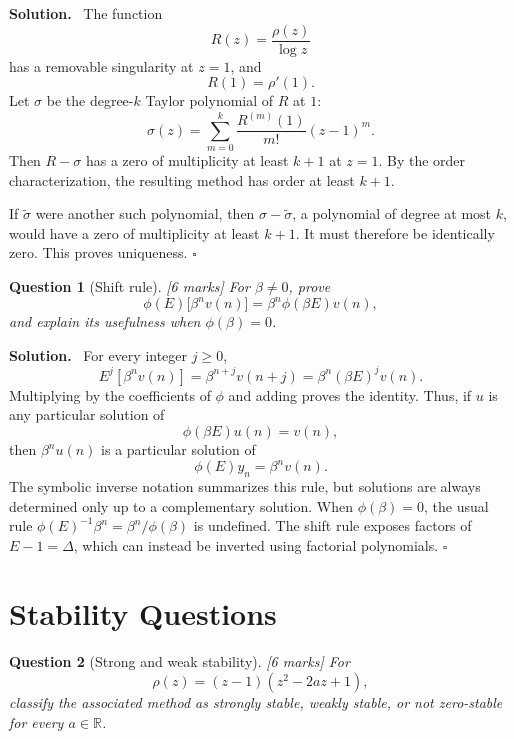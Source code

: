 \documentclass[11pt,a4paper]{article}
\theoremstyle{questionstyle}
\newtheorem{question}{Question}
\newenvironment{solution}
  {\par\noindent\textbf{\color{solutiongreen}Solution.}\ }
  {\hfill$\square$\par}
\newcommand{\pointmark}[1]{\hfill\textnormal{\textit{[#1 marks]}}}
\newcommand{\R}{\mathbb{R}}
\begin{document}
\begin{solution}
The function
\[
  R(z)=\frac{\rho(z)}{\log z}
\]
has a removable singularity at \(z=1\), and
\[
  R(1)=\rho'(1).
\]
Let \(\sigma\) be the degree-\(k\) Taylor polynomial of \(R\) at \(1\):
\[
  \sigma(z)=\sum_{m=0}^{k}
  \frac{R^{(m)}(1)}{m!}(z-1)^m.
\]
Then \(R-\sigma\) has a zero of multiplicity at least \(k+1\) at
\(z=1\).  By the order characterization, the resulting method has
order at least \(k+1\).

If \(\widetilde\sigma\) were another such polynomial, then
\(\sigma-\widetilde\sigma\), a polynomial of degree at most \(k\),
would have a zero of multiplicity at least \(k+1\).  It must therefore
be identically zero.  This proves uniqueness.
\end{solution}

\begin{question}[Shift rule]\pointmark{6}
For \(\beta\neq0\), prove
\[
  \phi(E)\bigl[\beta^n v(n)\bigr]
  =\beta^n\phi(\beta E)v(n),
\]
and explain its usefulness when \(\phi(\beta)=0\).
\end{question}

\begin{solution}
For every integer \(j\geq0\),
\[
  E^j[\beta^nv(n)]
  =\beta^{n+j}v(n+j)
  =\beta^n(\beta E)^jv(n).
\]
Multiplying by the coefficients of \(\phi\) and adding proves the
identity.  Thus, if \(u\) is any particular solution of
\[
  \phi(\beta E)u(n)=v(n),
\]
then \(\beta^nu(n)\) is a particular solution of
\[
  \phi(E)y_n=\beta^nv(n).
\]
The symbolic inverse notation summarizes this rule, but solutions are
always determined only up to a complementary solution.
When \(\phi(\beta)=0\), the usual rule
\(\phi(E)^{-1}\beta^n=\beta^n/\phi(\beta)\) is undefined.  The shift
rule exposes factors of \(E-1=\Delta\), which can instead be inverted
using factorial polynomials.
\end{solution}

\section{Stability Questions}

\begin{question}[Strong and weak stability]\pointmark{6}
For
\[
  \rho(z)=(z-1)(z^2-2az+1),
\]
classify the associated method as strongly stable, weakly stable, or
not zero-stable for every \(a\in\R\).
\end{question}
\end{document}
